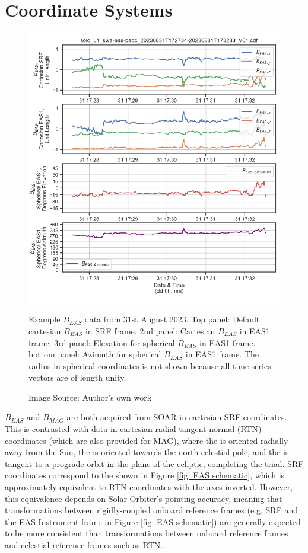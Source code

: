\section{Coordinate Systems} \label{coordinate systems}

\begin{figure}[h!]
    \centering
    \centerfloat
    \includegraphics[width=1.05\linewidth]{figures/Transformation Example.png}
    \caption{Example \(B_{EAS}\) data from 31st August 2023. Top panel: Default cartesian \(B_{EAS}\) in SRF frame. 2nd panel: Cartesian \(B_{EAS}\) in EAS1 frame. 3rd panel: Elevation for spherical \(B_{EAS}\) in EAS1 frame. bottom panel: Azimuth for spherical \(B_{EAS}\) in EAS1 frame. The radius in spherical coordinates is not shown because all time series vectors are of length unity.}
    \caption*{Image Source: Author's own work}
    \label{fig: trans example}
\end{figure}

\(B_{EAS}\) and \(B_{MAG}\) are both acquired from SOAR in cartesian SRF coordinates. This is contrasted with data in cartesian radial-tangent-normal (RTN) coordinates (which are also provided for MAG\cite{soar}), where the  is oriented radially away from the Sun, the  is oriented towards the north celestial pole, and the  is tangent to a prograde orbit in the plane of the ecliptic, completing the triad. SRF coordinates correspond to the  shown in Figure \ref{fig: EAS schematic}, which is approximately equivalent to RTN coordinates with the  axes inverted. However, this equivalence depends on Solar Orbiter's pointing accuracy, meaning that transformations between rigidly-coupled onboard reference frames (e.g. SRF and the EAS Instrument frame in Figure \ref{fig: EAS schematic}) are generally expected to be more consistent than transformations between onboard reference frames and celestial reference frames such as RTN\cite{erofeev2019}.
\\

